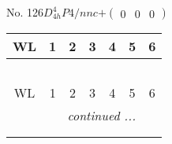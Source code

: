 \documentclass[fleqn,9pt,landscape]{jsarticle}
\begin{document}
\newpage
No. 126\quad$D_{4h}^{4}$\quad$P4/nnc$\quad[ tetragonal ]\quad$+\begin{pmatrix} 0 & 0 & 0 \end{pmatrix}$
\begin{center}
\renewcommand{\arraystretch}{1.2}
\begin{longtable}{ccccccc}
 \hline \hline
WL & 1 & 2 & 3 & 4 & 5 & 6 \\ \hline \endfirsthead

\multicolumn{6}{l}{\tablename\ \thetable{}} \\
 \hline \hline
WL & 1 & 2 & 3 & 4 & 5 & 6 \\ \hline \endhead

 \hline \hline
\multicolumn{6}{r}{\footnotesize\it continued ...} \\ \endfoot

 \hline \hline
\multicolumn{6}{r}{} \\ \endlastfoot


\end{longtable}
\end{center}
\end{document}
